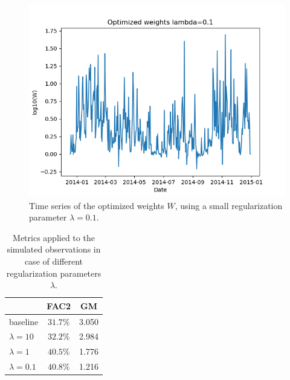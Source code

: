 \documentclass{article}
\begin{document}
\begin{figure}
\begin{minipage}{.31\textwidth}
		\label{fig: optimized weights timeseries lambda=1}
	\end{minipage}\hfill
	\begin{minipage}{.31\textwidth}
	\centering
	\includegraphics[width=\linewidth]{../plots/Optimized_weights_timeseries_lambda01.png}
	\caption{Time series of the optimized weights $W$, using a small regularization parameter $\lambda=0.1$.}
	\label{fig: optimized weights timeseries lambda=0.1}
	\end{minipage}
\end{figure}

\begin{table}
	\centering
	\caption{Metrics applied to the simulated observations in case of different regularization parameters $\lambda$.}\label{table: evaluated metrics}
\begin{tabular}{|l||c|c|}
	\hline
	&FAC2&GM\\\hline
	baseline&$31.7\%$&3.050\\\hline
	$\lambda=10$&$32.2\%$&2.984\\\hline	
	$\lambda=1$&$40.5\%$&1.776\\\hline	
	$\lambda=0.1$&$40.8\%$&1.216\\\hline
\end{tabular}
\end{table}
\end{document}
